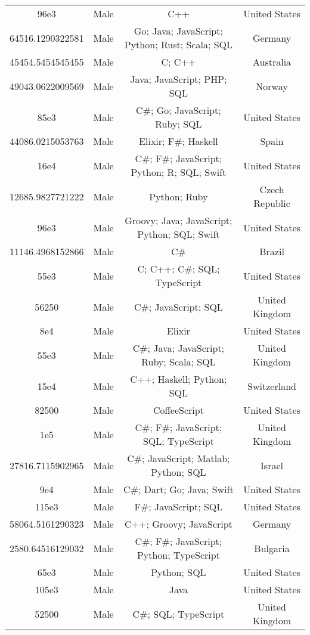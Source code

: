 \begin{center}
\begin{tabular}{ |c|c|c|c| }
96e3  &  Male  &  C++  &  United States  \\ 
64516.1290322581  &  Male  &  Go; Java; JavaScript; Python; Rust; Scala; SQL  &  Germany  \\ 
45454.5454545455  &  Male  &  C; C++  &  Australia  \\ 
49043.0622009569  &  Male  &  Java; JavaScript; PHP; SQL  &  Norway  \\ 
85e3  &  Male  &  C\#; Go; JavaScript; Ruby; SQL  &  United States  \\ 
44086.0215053763  &  Male  &  Elixir; F\#; Haskell  &  Spain  \\ 
16e4  &  Male  &  C\#; F\#; JavaScript; Python; R; SQL; Swift  &  United States  \\ 
12685.9827721222  &  Male  &  Python; Ruby  &  Czech Republic  \\ 
96e3  &  Male  &  Groovy; Java; JavaScript; Python; SQL; Swift  &  United States  \\ 
11146.4968152866  &  Male  &  C\#  &  Brazil  \\ 
55e3  &  Male  &  C; C++; C\#; SQL; TypeScript  &  United States  \\ 
56250  &  Male  &  C\#; JavaScript; SQL  &  United Kingdom  \\ 
8e4  &  Male  &  Elixir  &  United States  \\ 
55e3  &  Male  &  C\#; Java; JavaScript; Ruby; Scala; SQL  &  United Kingdom  \\ 
15e4  &  Male  &  C++; Haskell; Python; SQL  &  Switzerland  \\ 
82500  &  Male  &  CoffeeScript  &  United States  \\ 
1e5  &  Male  &  C\#; F\#; JavaScript; SQL; TypeScript  &  United Kingdom  \\ 
27816.7115902965  &  Male  &  C\#; JavaScript; Matlab; Python; SQL  &  Israel  \\ 
9e4  &  Male  &  C\#; Dart; Go; Java; Swift  &  United States  \\ 
115e3  &  Male  &  F\#; JavaScript; SQL  &  United States  \\ 
58064.5161290323  &  Male  &  C++; Groovy; JavaScript  &  Germany  \\ 
2580.64516129032  &  Male  &  C\#; F\#; JavaScript; Python; TypeScript  &  Bulgaria  \\ 
65e3  &  Male  &  Python; SQL  &  United States  \\ 
105e3  &  Male  &  Java  &  United States  \\ 
52500  &  Male  &  C\#; SQL; TypeScript  &  United Kingdom  \\ 

\end{tabular}
\end{center}
